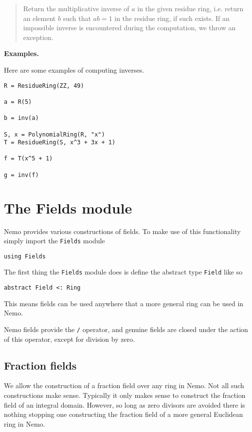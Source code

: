 \documentclass[a4paper,10pt]{article}
\newcommand{\code}{\lstinline}
\newcommand{\desc}[1]{\vspace{-3mm}\begin{quote}#1\end{quote}}
\begin{document}
{{{\desc{Return the multiplicative inverse of $a$ in the given residue
ring, i.e. return an element $b$ such that $ab = 1$ in the residue ring,
if such exists. If an impossible inverse is encountered during the
computation, we throw an exception.}

\textbf{Examples.}

Here are some examples of computing inverses.

\begin{lstlisting}
R = ResidueRing(ZZ, 49)

a = R(5)

b = inv(a)

S, x = PolynomialRing(R, "x")
T = ResidueRing(S, x^3 + 3x + 1)

f = T(x^5 + 1)

g = inv(f)
\end{lstlisting}

\section{The Fields module}

Nemo provides various constructions of fields. To make use of this 
functionality simply import the \code{Fields} module

\begin{lstlisting}
using Fields
\end{lstlisting}

The first thing the \code{Fields} module does is define the abstract
type \code{Field} like so

\begin{lstlisting}
abstract Field <: Ring
\end{lstlisting}

This means fields can be used anywhere that a more general ring can be used
in Nemo.

Nemo fields provide the \code{/} operator, and genuine fields are closed under
the action of this operator, except for division by zero.

\subsection{Fraction fields}

We allow the construction of a fraction field over any ring in Nemo. Not all
such constructions make sense. Typically it only makes sense to construct the
fraction field of an integral domain. However, so long as zero divisors are
avoided there is nothing stopping one constructing the fraction field of a
more general Euclidean ring in Nemo.

}}}
\end{document}
